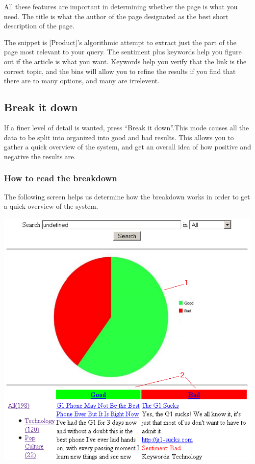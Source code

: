 \documentclass[titlepage]{article}
\begin{document}
All these features are important in determining whether the page is what you
need. The title is what the author of the page designated as the best short
description of the page.

The snippet is [Product]'s algorithmic attempt to extract just the part of the
page most relevant to your query. The sentiment plus keywords help you figure
out if the article is what you want. Keywords help you verify that the link is
the correct topic, and the bins will allow you to refine the results if you
find that there are to many options, and many are irrelevent.

\subsection{Break it down}
If a finer level of detail is wanted, press “Break it down”.This mode causes
all the data to be split into organized into good and bad results. This allows
you to gather a quick overview of the system, and get an overall idea of how
positive and negative the results are.

\subsubsection{How to read the breakdown}
The following screen helps us determine how the breakdown works in order to
get a quick overview of the system.
\begin{center}
\includegraphics{brokendown.png}
\end{center}
\end{document}
